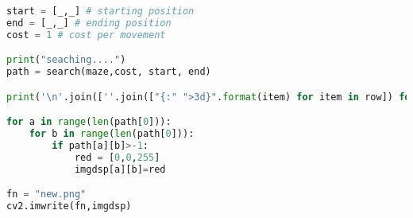 \begin{appendices}
\begin{lstlisting}[language=Python]
start = [_,_] # starting position
end = [_,_] # ending position
cost = 1 # cost per movement

print("seaching....")
path = search(maze,cost, start, end)

print('\n'.join([''.join(["{:" ">3d}".format(item) for item in row]) for row in path]))

for a in range(len(path[0])):
	for b in range(len(path[0])):
		if path[a][b]>-1:
			red = [0,0,255]
			imgdsp[a][b]=red

fn = "new.png"
cv2.imwrite(fn,imgdsp)


\end{lstlisting}
\end{appendices}